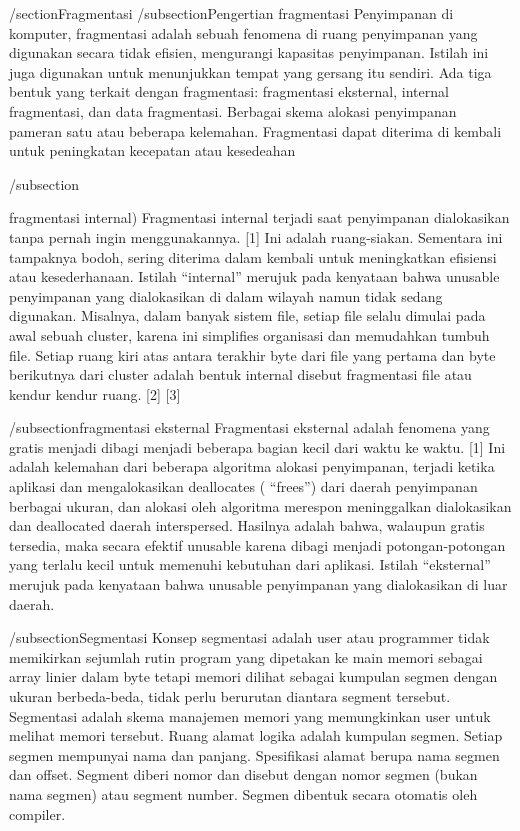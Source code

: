 /section{Fragmentasi}
/subsection{Pengertian fragmentasi}	
	Penyimpanan di komputer, fragmentasi adalah sebuah fenomena di ruang penyimpanan yang digunakan secara tidak efisien, mengurangi kapasitas penyimpanan. Istilah ini juga digunakan untuk menunjukkan tempat yang gersang itu sendiri.
	Ada tiga bentuk yang terkait dengan fragmentasi: fragmentasi eksternal, internal fragmentasi, dan data fragmentasi. Berbagai skema alokasi penyimpanan pameran satu atau beberapa kelemahan. Fragmentasi dapat diterima di kembali untuk peningkatan kecepatan atau kesedeahan
	
	/subsection{fragmentasi internal)
	Fragmentasi internal terjadi saat penyimpanan dialokasikan tanpa pernah ingin menggunakannya. [1] Ini adalah ruang-siakan. Sementara ini tampaknya bodoh, sering diterima dalam kembali untuk meningkatkan efisiensi atau kesederhanaan. Istilah “internal” merujuk pada kenyataan bahwa unusable penyimpanan yang dialokasikan di dalam wilayah namun tidak sedang digunakan.
	Misalnya, dalam banyak sistem file, setiap file selalu dimulai pada awal sebuah cluster, karena ini simplifies organisasi dan memudahkan tumbuh file. Setiap ruang kiri atas antara terakhir byte dari file yang pertama dan byte berikutnya dari cluster adalah bentuk internal disebut fragmentasi file atau kendur kendur ruang. [2] [3]

    /subsection{fragmentasi eksternal}
    Fragmentasi eksternal adalah fenomena yang gratis menjadi dibagi menjadi beberapa bagian kecil dari waktu ke waktu. [1] Ini adalah kelemahan dari beberapa algoritma alokasi penyimpanan, terjadi ketika aplikasi dan mengalokasikan deallocates ( “frees”) dari daerah penyimpanan berbagai ukuran, dan alokasi oleh algoritma merespon meninggalkan dialokasikan dan deallocated daerah interspersed. Hasilnya adalah bahwa, walaupun gratis tersedia, maka secara efektif unusable karena dibagi menjadi potongan-potongan yang terlalu kecil untuk memenuhi kebutuhan dari aplikasi. Istilah “eksternal” merujuk pada kenyataan bahwa unusable penyimpanan yang dialokasikan di luar daerah.

    /subsection{Segmentasi}
    Konsep segmentasi adalah user atau programmer tidak memikirkan sejumlah rutin program yang dipetakan ke main memori sebagai array linier dalam byte tetapi memori dilihat sebagai kumpulan segmen dengan ukuran berbeda-beda, tidak perlu berurutan diantara segment tersebut.
    Segmentasi adalah skema manajemen memori yang memungkinkan user untuk melihat memori tersebut. Ruang alamat logika adalah kumpulan segmen. Setiap segmen mempunyai nama dan panjang. Spesifikasi alamat berupa nama segmen dan offset. Segment diberi nomor dan disebut dengan nomor segmen (bukan nama segmen) atau segment number. Segmen dibentuk secara otomatis oleh compiler.


}
